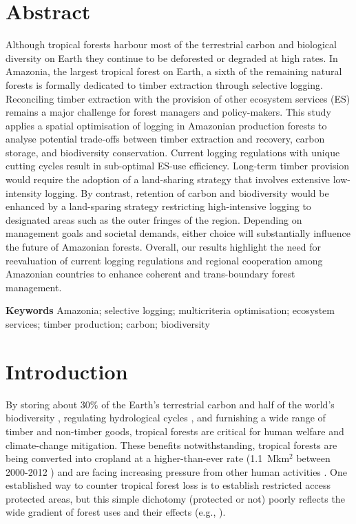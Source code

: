 \documentclass[12pt]{article}
\begin{document}
\section*{Abstract}

Although tropical forests harbour most of the terrestrial carbon and biological diversity on Earth they continue to be deforested or degraded at high rates. In Amazonia, the largest tropical forest on Earth, a sixth of the remaining natural forests is formally dedicated to timber extraction through selective logging. Reconciling timber extraction with the provision of other ecosystem services (ES) remains a major challenge for forest managers and policy-makers. This study applies a spatial optimisation of logging in Amazonian production forests to analyse potential trade-offs between timber extraction and recovery, carbon storage, and biodiversity conservation. Current logging regulations with unique cutting cycles result in sub-optimal ES-use efficiency. Long-term timber provision would require the adoption of a land-sharing strategy that involves extensive low-intensity logging. By contrast, retention of carbon and biodiversity would be enhanced by a land-sparing strategy restricting high-intensive logging to designated areas such as the outer fringes of the region. Depending on management goals and societal demands, either choice will substantially influence the future of Amazonian forests. Overall, our results highlight the need for reevaluation of current logging regulations and regional cooperation among Amazonian countries to enhance coherent and trans-boundary forest management.

\vspace{1cm}
\textbf{Keywords} Amazonia; selective logging; multicriteria optimisation; ecosystem services; timber production; carbon; biodiversity


\section*{Introduction}

By storing about 30\% of the Earth’s terrestrial carbon \cite{Pan2013} and half of the world’s biodiversity \cite{Pimm2014}, regulating hydrological cycles \cite{Fisher2009a}, and furnishing a wide range of timber and non-timber goods, tropical forests are critical for human welfare and climate-change mitigation. These benefits notwithstanding, tropical forests are being converted into cropland at a higher-than-ever rate (1.1~Mkm$^2$ between 2000-2012 \cite{Hansen2013}) and are facing increasing pressure from other human activities \cite{Lewis2015}. One established way to counter tropical forest loss is to establish restricted access protected areas, but this simple dichotomy (protected or not) poorly reflects the wide gradient of forest uses and their effects (e.g., \cite{DeCastroSolar2015,Gibson2011}). 
\end{document}
